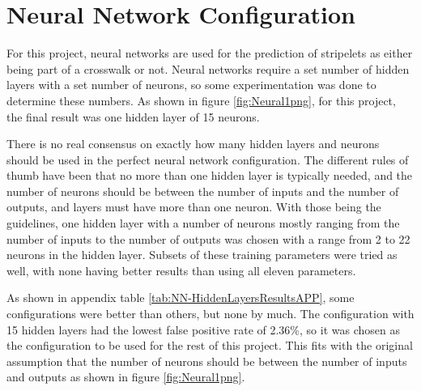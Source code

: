 \documentclass[12pt]{ucthesis}
\begin{document}
\section{Neural Network Configuration}
For this project, neural networks are used for the prediction of stripelets as either being part of a crosswalk or not. Neural networks require a set number of hidden layers with a set number of neurons, so some experimentation was done to determine these numbers. As shown in figure \ref{fig:Neural1png}, for this project, the final result was one hidden layer of 15 neurons. 


There is no real consensus on exactly how many hidden layers and neurons should be used in the perfect neural network configuration. The different rules of thumb have been that no more than one hidden layer is typically needed, and the number of neurons should be between the number of inputs and the number of outputs, and layers must have more than one neuron\cite{Heaton:2008:INN:1502373}. With those being the guidelines, one hidden layer with a number of neurons mostly ranging from the number of inputs to the number of outputs was chosen with a range from 2 to 22 neurons in the hidden layer. Subsets of these training parameters were tried as well, with none having better results than using all eleven parameters. 



As shown in appendix table \ref{tab:NN-HiddenLayersResultsAPP}, some configurations were better than others, but none by much. The configuration with 15 hidden layers had the lowest false positive rate of 2.36\%, so it was chosen as the configuration to be used for the rest of this project. This fits with the original assumption that the number of neurons should be between the number of inputs and outputs as shown in figure \ref{fig:Neural1png}. 
\end{document}
